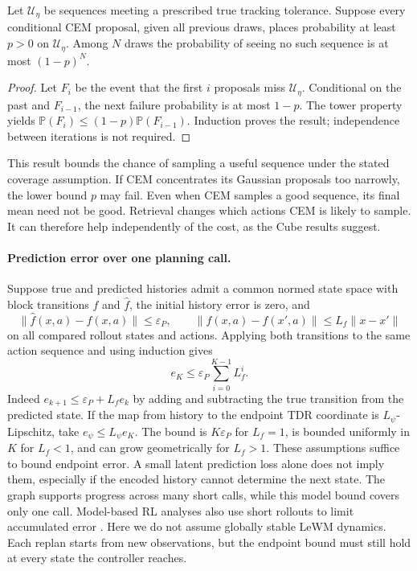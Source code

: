 \documentclass{article} %
\newcommand{\PP}{\mathbb P}
\theoremstyle{definition}
\theoremstyle{remark}
\begin{document}
\begin{proposition}
\label{prop:coverage}
Let $\mathcal U_\eta$ be sequences meeting a prescribed true tracking tolerance.
Suppose every conditional CEM proposal, given all previous draws, places probability
at least $p>0$ on $\mathcal U_\eta$. Among $N$ draws the probability of seeing no such
sequence is at most $(1-p)^N$.
\end{proposition}
\begin{proof}
Let $F_i$ be the event that the first $i$ proposals miss $\mathcal U_\eta$.
Conditional on the past and $F_{i-1}$, the next failure probability is at most $1-p$.
The tower property yields $\PP(F_i)\le(1-p)\PP(F_{i-1})$.
Induction proves the result; independence between iterations is not required.
\end{proof}
This result bounds the chance of sampling a useful sequence under the stated coverage assumption.
If CEM concentrates its Gaussian proposals too narrowly, the lower bound $p$ may fail.
Even when CEM samples a good sequence, its final mean need not be good.
Retrieval changes which actions CEM is likely to sample. It can therefore help
independently of the cost, as the Cube results suggest.

\paragraph{Prediction error over one planning call.}
Suppose true and predicted histories admit a common normed state
space with block transitions $f$ and $\hat f$, the initial history error is zero, and
\[
 \|\hat f(x,a)-f(x,a)\|\le\varepsilon_P,\qquad
 \|f(x,a)-f(x',a)\|\le L_f\|x-x'\|
\]
on all compared rollout states and actions. Applying both transitions to the same
action sequence and using induction gives
\begin{equation}
 e_K\le\varepsilon_P\sum_{i=0}^{K-1}L_f^i .
 \label{eq:rollout-error}
\end{equation}
Indeed $e_{k+1}\le\varepsilon_P+L_fe_k$ by adding and subtracting the true transition
from the predicted state. If the map from history to the endpoint TDR coordinate
is $L_\psi$-Lipschitz, take $e_\psi\le L_\psi e_K$.
The bound is $K\varepsilon_P$ for $L_f=1$, is bounded uniformly in $K$ for
$L_f<1$, and can grow geometrically for $L_f>1$.
These assumptions suffice to bound endpoint error. A small latent prediction loss
alone does not imply them, especially if the encoded history cannot determine the next state.
The graph supports progress across many short calls, while this model bound covers
only one call. Model-based RL analyses also use short rollouts to limit accumulated
error \citep{mbpo}. Here we do not assume globally stable LeWM dynamics.
Each replan starts from new observations, but the endpoint bound must still hold
at every state the controller reaches.
\end{document}
